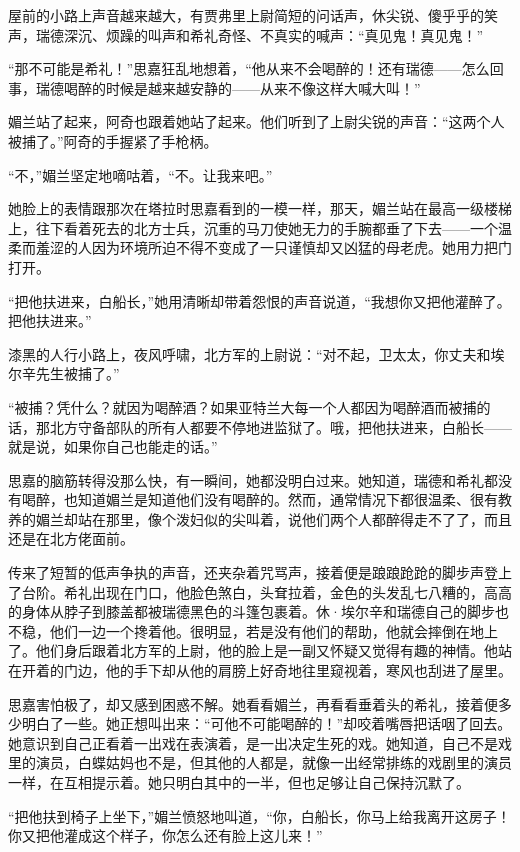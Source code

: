 \par 屋前的小路上声音越来越大，有贾弗里上尉简短的问话声，休尖锐、傻乎乎的笑声，瑞德深沉、烦躁的叫声和希礼奇怪、不真实的喊声：“真见鬼！真见鬼！”
\par “那不可能是希礼！”思嘉狂乱地想着，“他从来不会喝醉的！还有瑞德——怎么回事，瑞德喝醉的时候是越来越安静的——从来不像这样大喊大叫！”
\par 媚兰站了起来，阿奇也跟着她站了起来。他们听到了上尉尖锐的声音：“这两个人被捕了。”阿奇的手握紧了手枪柄。
\par “不，”媚兰坚定地嘀咕着，“不。让我来吧。”
\par 她脸上的表情跟那次在塔拉时思嘉看到的一模一样，那天，媚兰站在最高一级楼梯上，往下看着死去的北方士兵，沉重的马刀使她无力的手腕都垂了下去——一个温柔而羞涩的人因为环境所迫不得不变成了一只谨慎却又凶猛的母老虎。她用力把门打开。
\par “把他扶进来，白船长，”她用清晰却带着怨恨的声音说道，“我想你又把他灌醉了。把他扶进来。”
\par 漆黑的人行小路上，夜风呼啸，北方军的上尉说：“对不起，卫太太，你丈夫和埃尔辛先生被捕了。”
\par “被捕？凭什么？就因为喝醉酒？如果亚特兰大每一个人都因为喝醉酒而被捕的话，那北方守备部队的所有人都要不停地进监狱了。哦，把他扶进来，白船长——就是说，如果你自己也能走的话。”
\par 思嘉的脑筋转得没那么快，有一瞬间，她都没明白过来。她知道，瑞德和希礼都没有喝醉，也知道媚兰是知道他们没有喝醉的。然而，通常情况下都很温柔、很有教养的媚兰却站在那里，像个泼妇似的尖叫着，说他们两个人都醉得走不了了，而且还是在北方佬面前。
\par 传来了短暂的低声争执的声音，还夹杂着咒骂声，接着便是踉踉跄跄的脚步声登上了台阶。希礼出现在门口，他脸色煞白，头耷拉着，金色的头发乱七八糟的，高高的身体从脖子到膝盖都被瑞德黑色的斗篷包裹着。休·埃尔辛和瑞德自己的脚步也不稳，他们一边一个搀着他。很明显，若是没有他们的帮助，他就会摔倒在地上了。他们身后跟着北方军的上尉，他的脸上是一副又怀疑又觉得有趣的神情。他站在开着的门边，他的手下却从他的肩膀上好奇地往里窥视着，寒风也刮进了屋里。
\par 思嘉害怕极了，却又感到困惑不解。她看看媚兰，再看看垂着头的希礼，接着便多少明白了一些。她正想叫出来：“可他不可能喝醉的！”却咬着嘴唇把话咽了回去。她意识到自己正看着一出戏在表演着，是一出决定生死的戏。她知道，自己不是戏里的演员，白蝶姑妈也不是，但其他的人都是，就像一出经常排练的戏剧里的演员一样，在互相提示着。她只明白其中的一半，但也足够让自己保持沉默了。
\par “把他扶到椅子上坐下，”媚兰愤怒地叫道，“你，白船长，你马上给我离开这房子！你又把他灌成这个样子，你怎么还有脸上这儿来！”
